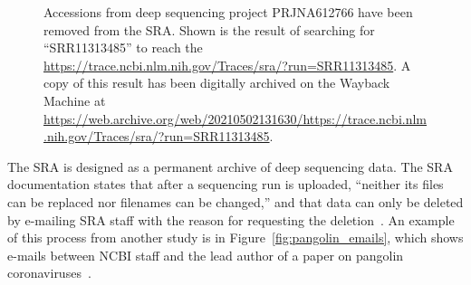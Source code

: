 \documentclass[9pt,twocolumn,twoside]{gsajnl_modified}
\begin{document}
\begin{figure}[]
\centering
{}
\caption{Accessions from deep sequencing project PRJNA612766 have been removed from the SRA.
Shown is the result of searching for ``SRR11313485'' to reach the \url{https://trace.ncbi.nlm.nih.gov/Traces/sra/?run=SRR11313485}.
A copy of this result has been digitally archived on the Wayback Machine at \url{https://web.archive.org/web/20210502131630/https://trace.ncbi.nlm.nih.gov/Traces/sra/?run=SRR11313485}.
}%
\label{fig:acc_removed}
\end{figure}

The SRA is designed as a permanent archive of deep sequencing data.
The SRA documentation states that after a sequencing run is uploaded, ``neither its files can be replaced nor filenames can be changed,'' and that data can only be deleted by e-mailing SRA staff with the reason for requesting the deletion~\citep{SRA_deletion}.
An example of this process from another study is in Figure~\ref{fig:pangolin_emails}, which shows e-mails between NCBI staff and the lead author of a paper on pangolin coronaviruses~\citep{xiao2020isolation}.
\end{document}
